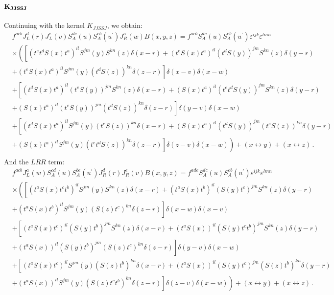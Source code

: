 \documentclass[11pt,a4paper]{article}
\begin{document}
\subsection*{$\bf K_{JJSSJ}$}

Continuing with the kernel $K_{JJSSJ}$, we obtain: 
\begin{equation}\begin{split}
&f^{acb}J_{L}^{d}(r)J_{L}^{e}(v)S_{A}^{dc}(u)S_{A}^{eb}(u^{\prime})J_{R}^{a}(w)B(x,y,z)=f^{acb}S_{A}^{dc}(u)S_{A}^{eb}(u^{\prime})\varepsilon^{ijk}\varepsilon^{lmn}\\
&\times \left(\left[(t^{e}t^{d}S(x)t^{a})^{il}S^{jm}(y)S^{kn}(z)\delta(x-r)+(t^{e}S(x)t^{a})^{il}(t^{d}S(y))^{jm}S^{kn}(z)\delta(y-r)\right.\right.\\
&\left.+(t^{e}S(x)t^{a})^{il}S^{jm}(y)(t^{d}S(z))^{kn}\delta(z-r)\right]\delta(x-v)\delta(x-w)\\
&+\left[(t^{d}S(x)t^{a})^{il}(t^{e}S(y))^{jm}S^{kn}(z)\delta(x-r)+(S(x)t^{a})^{il}(t^{e}t^{d}S(y))^{jm}S^{kn}(z)\delta(y-r)\right.\\
&\left.+(S(x)t^{a})^{il}(t^{e}S(y))^{jm}(t^{d}S(z))^{kn}\delta(z-r)\right]\delta(y-v)\delta(x-w)\\
&+\left[(t^{d}S(x)t^{a})^{il}S^{jm}(y)(t^{e}S(z))^{kn}\delta(x-r)+(S(x)t^{a})^{il}(t^{d}S(y))^{jm}(t^{e}S(z))^{kn}\delta(y-r)\right.\\
&\left.\left.+(S(x)t^{a})^{il}S^{jm}(y)(t^{e}t^{d}S(z))^{kn}\delta(z-r)\right]\delta(z-v)\delta(x-w)\right)+\left(x\leftrightarrow y\right)+\left(x\leftrightarrow z\right)\,. \\
\end{split}\end{equation}
And the  $LRR$  term:
\begin{equation}\begin{split}
&f^{acb}J_{L}^{a}(w)S_{A}^{cd}(u)S_{A}^{be}(u^{\prime})J_{R}^{d}(r)J_{R}^{e}(v)B(x,y,z)=f^{ade}S_{A}^{dc}(u)S_{A}^{eb}(u^{\prime})\varepsilon^{ijk}\varepsilon^{lmn}\\
&\times \left(\left[(t^{a}S(x)t^{c}t^{b})^{il}S^{jm}(y)S^{kn}(z)\delta(x-r)+(t^{a}S(x)t^{b})^{il}(S(y)t^{c})^{jm}S^{kn}(z)\delta(y-r)\right.\right.\\
&\left.+(t^{a}S(x)t^{b})^{il}S^{jm}(y)(S(z)t^{c})^{kn}\delta(z-r)\right]\delta(x-w)\delta(x-v)\\
&+\left[(t^{a}S(x)t^{c})^{il}(S(y)t^{b})^{jm}S^{kn}(z)\delta(x-r)+(t^{a}S(x))^{il}(S(y)t^{c}t^{b})^{jm}S^{kn}(z)\delta(y-r)\right.\\
&\left.+(t^{a}S(x))^{il}(S(y)t^{b})^{jm}(S(z)t^{c})^{kn}\delta(z-r)\right]\delta(y-v)\delta(x-w)\\
&+\left[(t^{a}S(x)t^{c})^{il}S^{jm}(y)(S(z)t^{b})^{kn}\delta(x-r)+(t^{a}S(x))^{il}(S(y)t^{c})^{jm}(S(z)t^{b})^{kn}\delta(y-r)\right.\\
&\left.\left.+(t^{a}S(x))^{il}S^{jm}(y)(S(z)t^{c}t^{b})^{kn}\delta(z-r)\right]\delta(z-v)\delta(x-w)\right)+\left(x\leftrightarrow y\right)+\left(x\leftrightarrow z\right)\,.\\
\end{split}\end{equation}
\end{document}
